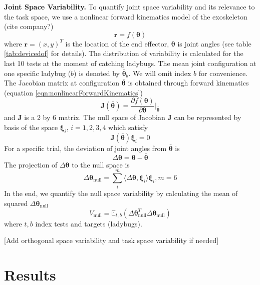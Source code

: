 \textbf{Joint Space Variability.}
To quantify joint space variability and its relevance to the task space, we use a nonlinear forward kinematics model of the exoskeleton (cite company?)
	\begin{equation}\label{eqn:nonlinearForwardKinematics}
	\bm{r} = f(\bm{\theta})
	\end{equation}
where $ \bm{r} = (x,y)^T $ is the location of the end effector, $ \bm{\theta} $ is joint angles (see table \ref{tab:devicedof} for details). 
The distribution of variability is calculated for the last 10 tests at the moment of catching ladybugs. 
The mean joint configuration at one specific ladybug ($ b $) is denoted by $ \bar{\bm{\theta}}_b $.
We will omit index $ b $ for convenience.
The Jacobian matrix at configuration $ \bar{\bm{\theta}} $ is obtained through forward kinematics (equation \ref{eqn:nonlinearForwardKinematics})
	\begin{equation}
	\bm{J}(\bar{\bm{\theta}}) = \frac{\partial f(\bm{\theta})}{\partial \bm{\theta}} \Big\rvert_{\bar{\bm{\theta}}}
	\end{equation}
and $ \bm{J} $ is a 2 by 6 matrix.
The null space of Jacobian $ \bm{J} $ can be represented by basis of the space $ \bm{\xi}_i $, $ i= 1,2,3,4 $ which satisfy
	\begin{equation}
	\bm{J}(\bar{\bm{\theta}}) \bm{\xi}_i = 0
	\end{equation}
For a specific trial, the deviation of joint angles from $ \bar{\bm{\theta}} $ is
	\begin{equation}
	\Delta\bm{\theta} = \bm{\theta} - \bar{\bm{\theta}}
	\end{equation}
The projection of $ \Delta\bm{\theta} $ to the null space is
	\begin{equation}
	\Delta\bm{\theta}_{\text{null}} = \sum_i^m \langle \Delta\bm{\theta}, \bm{\xi}_i \rangle \bm{\xi}_i, m=6
	\end{equation}
In the end, we quantify the null space variability by calculating the mean of squared $ \Delta\bm{\theta}_{\text{null}} $
	\begin{equation}
	V_{\text{null}} = \mathbb{E}_{t,b} (\Delta\bm{\theta}_{\text{null}}^T\Delta\bm{\theta}_{\text{null}})
	\end{equation}
where $ t,b $ index tests and targets (ladybugs).

[Add orthogonal space variability and task space variability if needed]


\section{Results}

